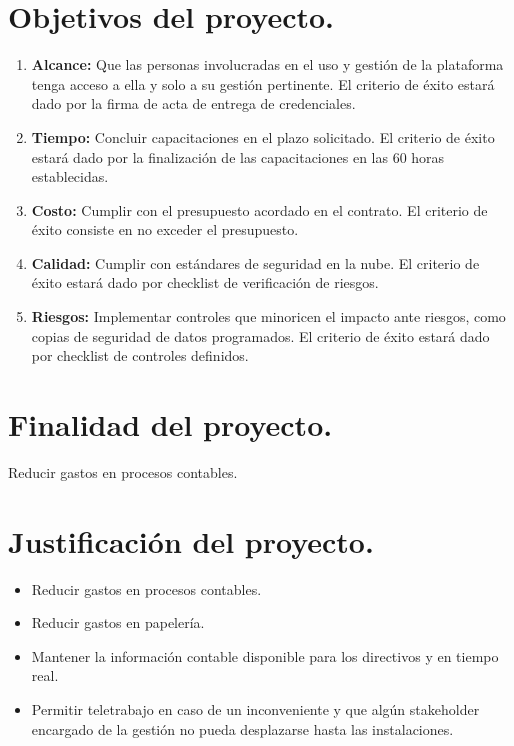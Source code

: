 \chapter{Objetivos del proyecto.}
%
\begin{enumerate}
	\item \textbf{Alcance:} Que las personas involucradas en el uso y gesti\'on de la 
	plataforma tenga acceso a ella y solo a su gesti\'on pertinente. El criterio de 
	\'exito estar\'a dado por la firma de acta de entrega de credenciales.%
	
	\item \textbf{Tiempo:} Concluir capacitaciones en el plazo solicitado. El criterio de
	\'exito estar\'a dado por la finalizaci\'on de las capacitaciones en las 60 horas
	establecidas.
	
	\item \textbf{Costo:} Cumplir con el presupuesto acordado en el contrato. El criterio de
	\'exito consiste en no exceder el presupuesto.
	
	\item \textbf{Calidad:} Cumplir con est\'andares de seguridad en la nube. El criterio de
	\'exito estar\'a dado por checklist de verificaci\'on de riesgos.
	
	\item \textbf{Riesgos:} Implementar controles que minoricen el impacto ante riesgos, como
	copias de seguridad de datos programados. El	criterio de \'exito estar\'a dado por 
	checklist de controles definidos.
\end{enumerate}
%
\chapter{Finalidad del proyecto.}
%
Reducir gastos en procesos contables.

\chapter{Justificaci\'on del proyecto.}
%
\begin{itemize}
	\item Reducir gastos en procesos contables.
	\item Reducir gastos en papeler\'ia.
	\item Mantener la informaci\'on contable disponible para los directivos y en tiempo real.
	\item Permitir teletrabajo en caso de un inconveniente y que alg\'un stakeholder encargado
	de la gesti\'on no pueda desplazarse hasta las instalaciones.
\end{itemize}